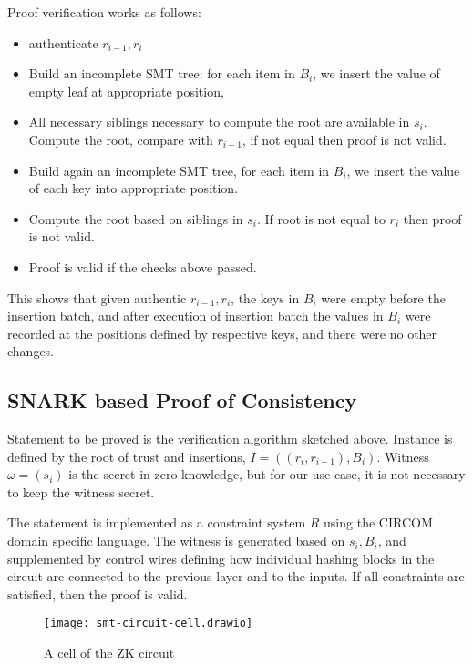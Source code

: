 Proof verification works as follows:
\begin{itemize}
    \item authenticate $r_{i-1}, r_i$
    \item Build an incomplete SMT tree: for each item in $B_i$, we insert the value of empty leaf at appropriate position,
    \item All necessary siblings necessary to compute the root are available in $s_i$. Compute the root, compare with $r_{i-1}$, if not equal then proof is not valid.
    \item Build again an incomplete SMT tree, for each item in $B_i$, we insert the value of each key into appropriate position.
    \item Compute the root based on siblings in $s_i$. If root is not equal to $r_i$ then proof is not valid.
    \item Proof is valid if the checks above passed.
\end{itemize}

This shows that given authentic $r_{i-1}, r_i$, the keys in $B_i$ were empty before the insertion batch, and after execution of insertion batch the values in $B_i$ were recorded at the positions defined by respective keys, and there were no other changes.


\subsection{SNARK based Proof of Consistency}

Statement to be proved is the verification algorithm sketched above. Instance is defined by the root of trust and insertions, $I = ((r_i, r_{i-1}),B_i)$. Witness $\omega = (s_i)$ is the secret in zero knowledge, but for our use-case, it is not necessary to keep the witness secret.

The statement is implemented as a constraint system $R$ using the CIRCOM domain specific language. The witness is generated based on $s_i, B_i$, and supplemented by control wires defining how individual hashing blocks in the circuit are connected to the previous layer and to the inputs. If all constraints are satisfied, then the proof is valid.

\begin{figure}[htb]
    \centering
    \texttt{[image: smt-circuit-cell.drawio]}
    \caption{A cell of the ZK circuit}
    \label{fig:zk-circuit-cell}
\end{figure}

